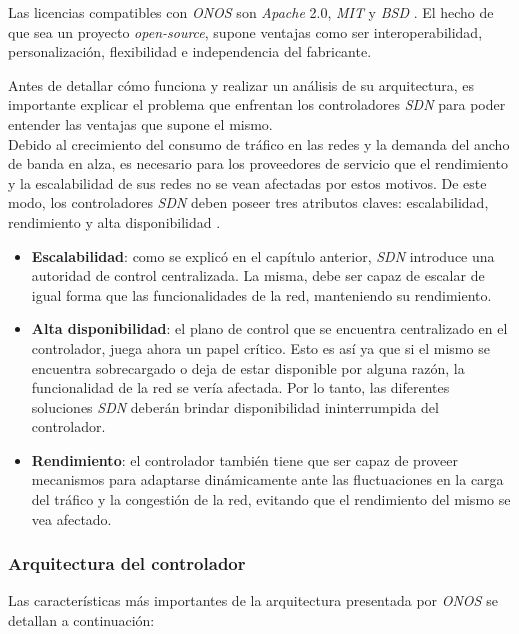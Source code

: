 Las licencias compatibles con \textit{ONOS} son \textit{Apache} 2.0, \textit{MIT} y \textit{BSD} \parencite{onfflic}. El hecho de que sea un proyecto \textit{open-source}, supone ventajas como ser interoperabilidad, personalización, flexibilidad e independencia del fabricante. 

Antes de detallar cómo funciona y realizar un análisis de su arquitectura, es importante explicar el problema que enfrentan los controladores \textit{SDN} para poder entender las ventajas que supone el mismo. 
\\

Debido al crecimiento del consumo de tráfico en las redes y la demanda del ancho de banda en alza, es necesario para los proveedores de servicio que el rendimiento y la escalabilidad de sus redes no se vean afectadas por estos motivos. De este modo, los controladores \textit{SDN} deben poseer tres atributos claves: escalabilidad, rendimiento y alta disponibilidad \parencite{sdnproblema}.

\begin{itemize}
	\item \textbf{Escalabilidad}: como se explicó en el capítulo anterior, \textit{SDN} introduce una autoridad de control centralizada. La misma, debe ser capaz de escalar de igual forma que las funcionalidades de la red, manteniendo su rendimiento.
	\item \textbf{Alta disponibilidad}: el plano de control que se encuentra centralizado en el controlador, juega ahora un papel crítico. Esto es así ya que si el mismo se encuentra sobrecargado o deja de estar disponible por alguna razón, la funcionalidad de la red se vería afectada. Por lo tanto, las diferentes soluciones \textit{SDN} deberán brindar disponibilidad ininterrumpida del controlador.
	\item \textbf{Rendimiento}: el controlador también tiene que ser capaz de proveer mecanismos para adaptarse dinámicamente ante las fluctuaciones en la carga del tráfico y la congestión de la red, evitando que el rendimiento del mismo se vea afectado. 
\end{itemize}

\subsubsection{Arquitectura del controlador}
Las características más importantes de la arquitectura presentada por \textit{ONOS} \parencite{onffwhite} se detallan a continuación:

